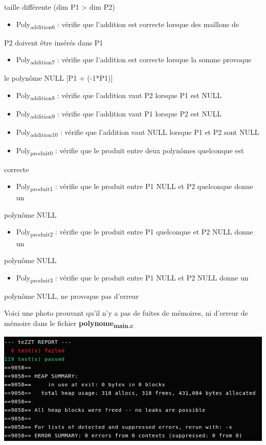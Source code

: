 \documentclass[11pt]{article}
\begin{document}
taille différente (dim P1 > dim P2)
\begin{itemize}
\item Poly\textsubscript{addition6} : vérifie que l'addition est correcte lorsque des maillons de
\end{itemize}
P2 doivent être insérés dans P1
\begin{itemize}
\item Poly\textsubscript{addition7} : vérifie que l'addition est correcte lorsque la somme provoque
\end{itemize}
le polynôme NULL [P1 + (-1*P1)]
\begin{itemize}
\item Poly\textsubscript{addition8} : vérifie que l'addition vaut P2 lorsque P1 est NULL
\item Poly\textsubscript{addition9} : vérifie que l'addition vaut P1 lorsque P2 est NULL
\item Poly\textsubscript{addition10} : vérifie que l'addition vaut NULL lorsque P1 et P2 sont NULL
\item Poly\textsubscript{produit0} : vérifie que le produit entre deux polynômes quelconque est
\end{itemize}
correcte
\begin{itemize}
\item Poly\textsubscript{produit1} : vérifie que le produit entre P1 NULL et P2 quelconque donne un
\end{itemize}
polynôme NULL
\begin{itemize}
\item Poly\textsubscript{produit2} : vérifie que le produit entre P1 quelconque et P2 NULL donne un
\end{itemize}
polynôme NULL
\begin{itemize}
\item Poly\textsubscript{produit3} : vérifie que le produit entre P1 NULL et P2 NULL donne un
\end{itemize}
polynôme NULL, ne provoque pas d'erreur


Voici une photo prouvant qu'il n'y a pas de fuites de mémoires, ni d'erreur de
mémoire dans le fichier \textbf{polynome\textsubscript{main.c}} 
\begin{center}
\includegraphics[width=.9\linewidth]{img/test_valgrind_polynome.png}
\end{center}
\end{document}
